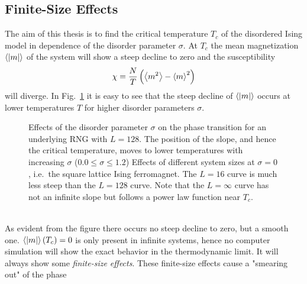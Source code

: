 \subsection{Finite-Size Effects}
\label{ssec:finitesize}
    The aim of this thesis is to find the critical temperature \(T_c\)
    of the disordered Ising model in dependence of the disorder parameter
    \(\sigma\). At \(T_c\) the mean magnetization \(\left< |m| \right>\) of
    the system will show a steep decline to zero and the susceptibility
    \begin{equation}
        \chi = \frac{N}{T}\left(\left< m^2 \right>-\left< m \right>^2\right)
    \end{equation}
    will diverge. In Fig.\ \ref{fig:smeared_out}
    it is easy to see that the steep decline of \(\left< |m| \right>\)
    occurs at lower temperatures \(T\) for higher
    disorder parameters \(\sigma\).
    \begin{figure}[htbp]
        \centering
        \caption[Phase Transition and Finite Size Effects]
        {
             Effects of the disorder
            parameter $\sigma$ on the phase transition
            for an underlying RNG with $L=128$. The position of the slope,
            and hence the critical temperature, moves to lower temperatures
            with increasing \(\sigma\) (\(0.0 \le \sigma \le 1.2\))
             Effects of different system
            sizes at \(\sigma = 0\), i.e.\ the square lattice Ising ferromagnet.
            The \(L=16\) curve is much less steep than the \(L=128\) curve.
            Note that the \(L=\infty\) curve has not an infinite slope but
            follows a power law function near \(T_c\).
        }
        \label{fig:smeared_out}
    \end{figure}\\
    As evident from the figure there occurs no steep decline to zero, but a
    smooth one. \(\left< \left\vert m\right\vert \right>(T_c) = 0\) is only present in infinite
    systems, hence no computer simulation will show the exact behavior in the
    thermodynamic limit. It will always show some \emph{finite-size effects}.
    These finite-size effects cause a "smearing out" of the phase
